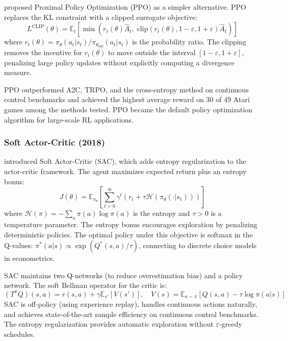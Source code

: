 \citet{Schulman2017} proposed Proximal Policy Optimization (PPO) as a simpler alternative. PPO replaces the KL constraint with a clipped surrogate objective:
\begin{equation}
L^{\text{CLIP}}(\theta) = \mathbb{E}_t \left[ \min\!\left( r_t(\theta) \hat{A}_t, \; \text{clip}(r_t(\theta), 1-\varepsilon, 1+\varepsilon) \hat{A}_t \right) \right]
\end{equation}
where $r_t(\theta) = \pi_\theta(a_t|s_t) / \pi_{\theta_{\text{old}}}(a_t|s_t)$ is the probability ratio. The clipping removes the incentive for $r_t(\theta)$ to move outside the interval $[1-\varepsilon, 1+\varepsilon]$, penalizing large policy updates without explicitly computing a divergence measure.

PPO outperformed A2C, TRPO, and the cross-entropy method on continuous control benchmarks and achieved the highest average reward on 30 of 49 Atari games among the methods tested. PPO became the default policy optimization algorithm for large-scale RL applications.

\subsubsection{Soft Actor-Critic (2018)}

\citet{Haarnoja2018} introduced Soft Actor-Critic (SAC), which adds entropy regularization to the actor-critic framework. The agent maximizes expected return plus an entropy bonus:
\begin{equation}
J(\theta) = \mathbb{E}_{\pi_\theta}\left[\sum_{t=0}^\infty \gamma^t \left(r_t + \tau \mathcal{H}(\pi_\theta(\cdot|s_t))\right)\right]
\end{equation}
where $\mathcal{H}(\pi) = -\sum_a \pi(a) \log \pi(a)$ is the entropy and $\tau > 0$ is a temperature parameter. The entropy bonus encourages exploration by penalizing deterministic policies. The optimal policy under this objective is softmax in the Q-values: $\pi^*(a|s) \propto \exp(Q^*(s,a)/\tau)$, connecting to discrete choice models in econometrics.

SAC maintains two Q-networks (to reduce overestimation bias) and a policy network. The soft Bellman operator for the critic is:
\begin{equation}
(T^\pi Q)(s,a) = r(s,a) + \gamma \mathbb{E}_{s'}\left[ V(s') \right], \quad V(s) = \mathbb{E}_{a \sim \pi}[Q(s,a) - \tau \log \pi(a|s)]
\end{equation}
SAC is off-policy (using experience replay), handles continuous actions naturally, and achieves state-of-the-art sample efficiency on continuous control benchmarks. The entropy regularization provides automatic exploration without $\varepsilon$-greedy schedules.

